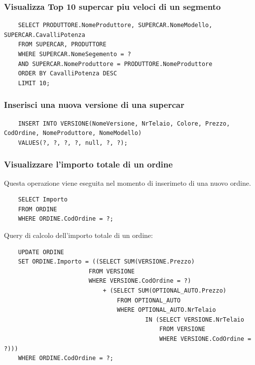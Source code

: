 \documentclass[11pt]{article}
\begin{document}
\subsubsection*{Visualizza Top 10 supercar piu veloci di un segmento}

\begin{lstlisting}
    SELECT PRODUTTORE.NomeProduttore, SUPERCAR.NomeModello, SUPERCAR.CavalliPotenza
    FROM SUPERCAR, PRODUTTORE
    WHERE SUPERCAR.NomeSegemento = ?
    AND SUPERCAR.NomeProduttore = PRODUTTORE.NomeProduttore
    ORDER BY CavalliPotenza DESC
    LIMIT 10;
\end{lstlisting}

\subsubsection*{Inserisci una nuova versione di una supercar}

\begin{lstlisting}
    INSERT INTO VERSIONE(NomeVersione, NrTelaio, Colore, Prezzo, CodOrdine, NomeProduttore, NomeModello)
    VALUES(?, ?, ?, ?, null, ?, ?);
\end{lstlisting}

\subsubsection*{Visualizzare l’importo totale di un ordine}

Questa operazione viene eseguita nel momento di inserimeto di una nuovo ordine.

\begin{lstlisting}
    SELECT Importo
    FROM ORDINE
    WHERE ORDINE.CodOrdine = ?;
\end{lstlisting}

Query di calcolo dell'importo totale di un ordine:

\begin{lstlisting}
    UPDATE ORDINE
    SET ORDINE.Importo = ((SELECT SUM(VERSIONE.Prezzo)
                        FROM VERSIONE 
                        WHERE VERSIONE.CodOrdine = ?) 
                            + (SELECT SUM(OPTIONAL_AUTO.Prezzo)
                                FROM OPTIONAL_AUTO
                                WHERE OPTIONAL_AUTO.NrTelaio 
                                        IN (SELECT VERSIONE.NrTelaio
                                            FROM VERSIONE
                                            WHERE VERSIONE.CodOrdine = ?)))
    WHERE ORDINE.CodOrdine = ?;
\end{lstlisting}
\end{document}

